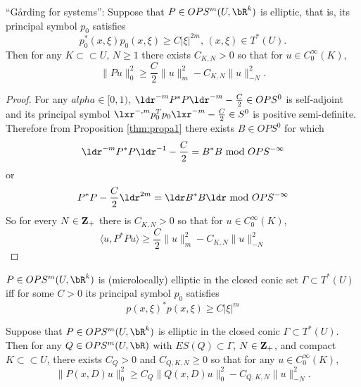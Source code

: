 \begin{theorem}
  \label{thm:garding}
  ``G\r{a}rding for systems'': Suppose that $P \in OPS^m(U,\bR^k)$ is elliptic, that is, its principal symbol $p_0$ satisfies 
\[
  p_0^*(x,\xi)p_0(x,\xi) \ge C|\xi|^{2m}, \, (x,\xi) \in T^*(U).
\]
Then for any $K \subset \subset U$, $N \ge 1$ there exists $C_{K,N} > 0$ so that for $u \in C^{\infty}_0(K)$, 
\[
  \|Pu\|^2_0 \ge \frac{C}{2}\|u\|^2_m - C_{K,N}\|u\|^2_{-N}.
\]
\end{theorem}

\begin{proof}
  For any $alpha \in [0,1)$, $\ldr^{-m}P^*P\ldr^{-m} - \frac{C}{2} \in OPS^0$ is self-adjoint  and its principal symbol $\lxr^{-,m}p_0^Tp_0\lxr^{-m} - \frac{C}{2} \in S^0$ is positive semi-definite. Therefore from Proposition \ref{thm:propa1} there exists $B \in OPS^0$ for which
  \[
    \ldr^{-m}P^*P\ldr^{-1} - \frac{C}{2} = B^*B \mbox{ mod } OPS^{-\infty}
  \]
  or
  \[
    P^*P -\frac{C}{2} \ldr^{2m} = \ldr B^*B \ldr \mbox{ mod } OPS^{-\infty}
  \]
  So for every $N  \in {\bf Z}_+$ there is $C_{K,N} > 0$ so that for $u \in C_0^{\infty}(K)$,  
  \[
    \langle u,P^*P u \rangle \ge \frac{C}{2}\|u\|_m^2 -   C_{K,N}\|u\|^2_{-N}
  \]
  
\end{proof}

\begin{definition} $P \in OPS^m(U,\bR^k)$ is (microlocally) elliptic in the closed conic set $\Gamma \subset T^*(U)$ iff for some $C>0$ its principal symbol $p_0$ satisfies
  \[
    p(x,\xi)^*p(x,\xi) \ge C|\xi|^m
  \]
\end{definition}

\begin{theorem} Suppose that $P \in OPS^m(U,\bR^k)$ is elliptic in the closed conic $\Gamma \subset T^*(U)$. Then for any $Q \in OPS^m(U,\bR)$ with $ES(Q) \subset \Gamma$, $N \in {\bf Z}_+$, and compact $K \subset \subset U$, there exists $C_Q > 0$ and $C_{Q,K,N} \ge 0$ so that for any $u \in C_0^{\infty}(K)$, 
  \[
    \|P(x,D)u\|^2_0  \ge C_Q\|Q(x,D)u\|_0^2 - C_{Q,K,N}\|u\|^2_{-N}.
  \]
\end{theorem}



